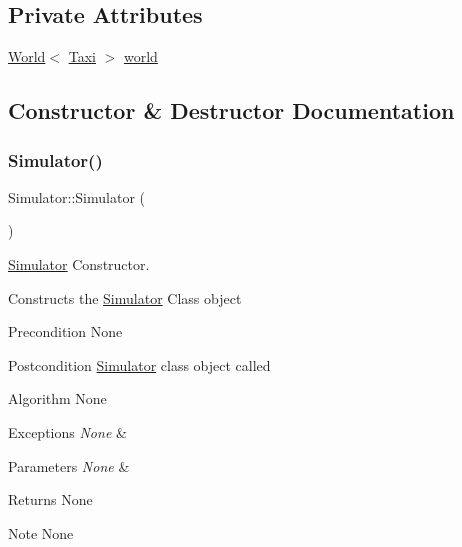 \subsection*{Private Attributes}
\begin{DoxyCompactItemize}
\item 
\hyperlink{class_world}{World}$<$ \hyperlink{class_taxi}{Taxi} $>$ \hyperlink{class_simulator_abc90be746b475a15bf194f5e49be36a7}{world}
\end{DoxyCompactItemize}


\subsection{Constructor \& Destructor Documentation}
\hypertarget{class_simulator_a031573bfcfe2e0f5c9539bcc1c7fc5d9}{}\label{class_simulator_a031573bfcfe2e0f5c9539bcc1c7fc5d9} 
\subsubsection{\texorpdfstring{Simulator()}{Simulator()}}
{\footnotesize\ttfamily Simulator\+::\+Simulator (\begin{DoxyParamCaption}{ }\end{DoxyParamCaption})}



\hyperlink{class_simulator}{Simulator} Constructor. 

Constructs the \hyperlink{class_simulator}{Simulator} Class object

\begin{DoxyPrecond}{Precondition}
None
\end{DoxyPrecond}
\begin{DoxyPostcond}{Postcondition}
\hyperlink{class_simulator}{Simulator} class object called
\end{DoxyPostcond}
\begin{DoxyParagraph}{Algorithm}
None
\end{DoxyParagraph}

\begin{DoxyExceptions}{Exceptions}
{\em None} & \\
\hline
\end{DoxyExceptions}

\begin{DoxyParams}{Parameters}
{\em None} & \\
\hline
\end{DoxyParams}
\begin{DoxyReturn}{Returns}
None
\end{DoxyReturn}
\begin{DoxyNote}{Note}
None 
\end{DoxyNote}
\hypertarget{class_simulator_a0f49aa04f42060a785adf77346b9de9f}{}\label{class_simulator_a0f49aa04f42060a785adf77346b9de9f} 
